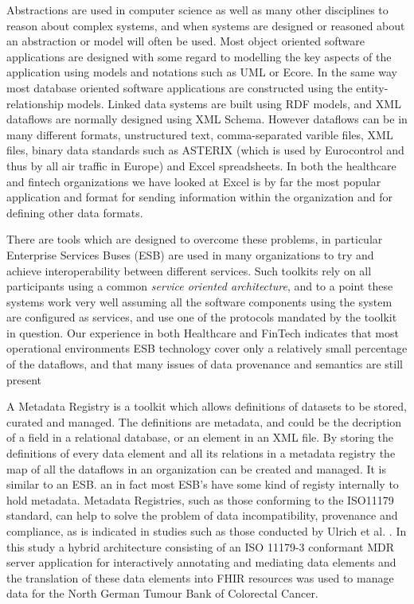 \documentclass{llncs}
\begin{document}
	Abstractions are used in computer science as well as many other disciplines to reason about complex systems, and when systems are designed or reasoned about an abstraction or model will often be used.  Most object oriented software applications are designed with some regard to modelling the key aspects of the application using models and notations such as UML or Ecore.  In the same way most database oriented software applications are constructed using the entity-relationship models. Linked data systems are built using RDF models, and XML dataflows are normally designed using XML Schema. However dataflows can be in many different formats, unstructured text, comma-separated varible files, XML files, binary data standards such as ASTERIX (which is used by Eurocontrol and thus by all air traffic in Europe) and Excel spreadsheets. In both the healthcare and fintech organizations we have looked at Excel is by far the most popular application and format for sending information within the organization and for defining other data formats.
	
	There are tools which are designed to overcome these problems, in particular Enterprise Services Buses (ESB) are used in many organizations to try and achieve interoperability between different services. Such toolkits rely on all participants using a common \emph{service oriented architecture}, and to a point these systems work very well assuming all the software components using the system are configured as services, and use one of the protocols mandated by the toolkit in question.  Our experience in both Healthcare and FinTech indicates that most operational environments ESB technology cover only a relatively small percentage of the dataflows, and that many issues of data provenance and semantics are still present
	
	A Metadata Registry is a toolkit which allows definitions of datasets to be stored, curated and managed. The definitions are metadata, and could be the decription of a field in a relational database, or an element in an XML file. By storing the definitions of every data element and all its relations in a metadata registry the map of all the dataflows in an organization can be created and managed. It is similar to an ESB. an in fact most ESB's have some kind of registy internally to hold metadata. Metadata Registries, such as those conforming to the ISO11179 standard, can help to solve the problem of data incompatibility, provenance and compliance, as is indicated in studies such as those conducted by Ulrich et al. \cite{MDRHL7} . In this study a hybrid architecture consisting of an ISO 11179-3 conformant MDR server application for interactively annotating and mediating data elements and the translation of these data elements into FHIR resources was used to manage data for the North German Tumour Bank of Colorectal Cancer. 
	
\end{document}
